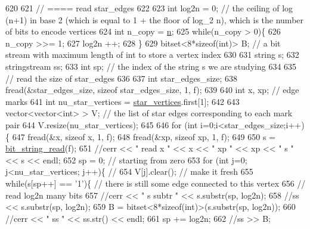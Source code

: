\begin{DoxyCode}
620 
621   \textcolor{comment}{// ==== read star\_edges}
622 
623   \textcolor{keywordtype}{int} log2n = 0; \textcolor{comment}{// the ceiling of log (n+1) in base 2 (which is equal to 1 + the floor of log\_2 n), which
       is the number of bits to encode vertices}
624   \textcolor{keywordtype}{int} n\_copy = \hyperlink{classmarked__graph__compressed_a8d841016ddb11cfd33748c8deb6277ba}{n};
625   \textcolor{keywordflow}{while}(n\_copy > 0)\{
626     n\_copy >>= 1;
627     log2n ++;
628   \}
629   bitset<8*sizeof(int)> B; \textcolor{comment}{// a bit stream with maximum length of int to store a vertex index}
630 
631   \textcolor{keywordtype}{string} s;
632   stringstream ss;
633   \textcolor{keywordtype}{int} sp; \textcolor{comment}{// the index of the string s we are studying }
634 
635   \textcolor{comment}{// read the size of star\_edges}
636 
637   \textcolor{keywordtype}{int} star\_edges\_size;
638   fread(&star\_edges\_size, \textcolor{keyword}{sizeof} star\_edges\_size, 1, f);
639 
640   \textcolor{keywordtype}{int} x, xp; \textcolor{comment}{// edge marks}
641   \textcolor{keywordtype}{int} nu\_star\_vertices = \hyperlink{classmarked__graph__compressed_a7a4ced4586e2e353f9076bd447df5208}{star\_vertices}.first[1];
642 
643   vector<vector<int> > V; \textcolor{comment}{// the list of star edges corresponding to each mark pair}
644   V.resize(nu\_star\_vertices);
645 
646   \textcolor{keywordflow}{for} (\textcolor{keywordtype}{int} i=0;i<star\_edges\_size;i++)\{
647     fread(&x, \textcolor{keyword}{sizeof} x, 1, f);
648     fread(&xp, \textcolor{keyword}{sizeof} xp, 1, f);
649   
650     s = \hyperlink{compression__helper_8cpp_a40e8dcbc036f96b28e003e882c4890b7}{bit\_string\_read}(f);
651     \textcolor{comment}{//cerr << " read  x " << x << " xp " << xp << " s " << s << endl;}
652     sp = 0; \textcolor{comment}{// starting from zero }
653     \textcolor{keywordflow}{for} (\textcolor{keywordtype}{int} j=0; j<nu\_star\_vertices; j++)\{ \textcolor{comment}{// }
654       V[j].clear(); \textcolor{comment}{// make it fresh}
655       \textcolor{keywordflow}{while}(s[sp++] == \textcolor{charliteral}{'1'})\{ \textcolor{comment}{// there is still some edge connected to this vertex }
656         \textcolor{comment}{// read log2n many bits}
657         \textcolor{comment}{//cerr << " s subtr " << s.substr(sp, log2n);}
658         \textcolor{comment}{//ss << s.substr(sp, log2n);}
659         B = bitset<8*sizeof(int)>(s.substr(sp, log2n));
660         \textcolor{comment}{//cerr << " ss " << ss.str() << endl;}
661         sp += log2n;
662         \textcolor{comment}{//ss >> B;}

\end{DoxyCode}
